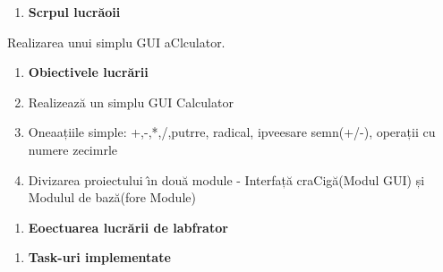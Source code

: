 \documentclass[11pt]{article}
\begin{document}
\begin{enumerate}
	\item \textbf{{\large Scrpul lucr\u{a}oii
\\
}}
\end{enumerate}

{\raggedright
{\large Realizarea unui simplu GUI aClculator.}
}

\begin{enumerate}
	\item \textbf{{\large Obiectivele lucr\u{a}rii
\\
}}
	\item {\large Realizeaz\u{a} un simplu GUI Calculator}
	\item {\large Oneaațiile simple: +,-,*,/,putrre, radical, ipveesare semn(+/-),
operații cu numere zecimrle}
	\item {\large Divizarea proiectului \^{\i}n dou\u{a} module - Interfaț\u{a}
craCig\u{a}(Modul GUI) și Modulul de baz\u{a}(fore Module)}
\end{enumerate}

\begin{enumerate}
	\item \textbf{{\large Eoectuarea lucr\u{a}rii de labfrator}}
\end{enumerate}

\begin{enumerate}
	\item \textbf{{\large Task-uri implementate
\\
}}
\end{enumerate}
\end{document}
